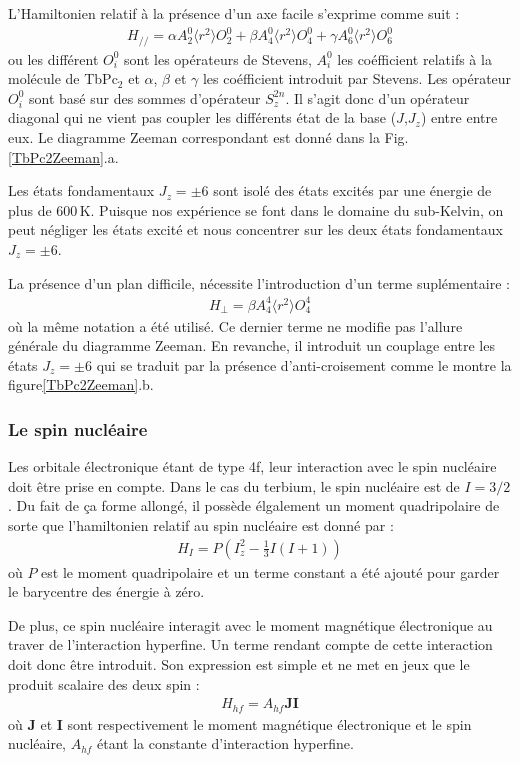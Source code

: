 L'Hamiltonien relatif à la présence d'un axe facile s'exprime comme suit :
\begin{eqnarray}
H_{//} = \alpha A_2^0 \langle r^2 \rangle O_2^0 + \beta A_4^0 \langle r^2 \rangle O_4^0 + \gamma A_6^0 \langle r^2 \rangle O_6^0
\end{eqnarray}
ou les différent $O_i^0$ sont les opérateurs de Stevens, $A_i^0$ les coéfficient relatifs à la molécule de TbPc$_2$ et $\alpha$, $\beta$ et $\gamma$ les coéfficient introduit par Stevens. Les opérateur $O^0_i$ sont basé sur des sommes d'opérateur $S_z^{2n}$. Il s'agit donc d'un opérateur diagonal qui ne vient pas coupler les différents état de la base ($J$,$J_z$) entre entre eux. Le diagramme Zeeman correspondant est donné dans la Fig.\ref{TbPc2Zeeman}.a.

Les états fondamentaux $J_z = \pm 6$ sont isolé des états excités par une énergie de plus de $600$\,K. Puisque nos expérience se font dans le domaine du sub-Kelvin, on peut négliger les états excité et nous concentrer sur les deux états fondamentaux  $J_z = \pm 6$.

La présence d'un plan difficile, nécessite l'introduction d'un terme suplémentaire :
\begin{eqnarray}
H_{\perp} = \beta A_4^4 \langle r^2 \rangle O_4^4
\end{eqnarray}
où la m\^eme notation a été utilisé. Ce dernier terme ne modifie pas l'allure générale du diagramme Zeeman. En revanche, il introduit un couplage entre les états  $J_z = \pm 6$ qui se traduit par la présence d'anti-croisement comme le montre la figure\ref{TbPc2Zeeman}.b.

\subsubsection{Le spin nucléaire}
Les orbitale électronique étant de type 4f, leur interaction avec le spin nucléaire doit \^etre prise en compte. Dans le cas du terbium, le spin nucléaire est de $I = 3/2$. Du fait de ça forme allongé, il possède élgalement un moment quadripolaire de sorte que l'hamiltonien relatif au spin nucléaire est donné par :
\begin{eqnarray}
H_I = P\left(I_z^2 - \frac{1}{3}I(I+1)\right)
\end{eqnarray}
où $P$ est le moment quadripolaire et un terme constant a été ajouté pour garder le barycentre des énergie à zéro.

De plus, ce spin nucléaire interagit avec le moment magnétique électronique au traver de l'interaction hyperfine. Un terme rendant compte de cette interaction doit donc \^etre introduit. Son expression est simple et ne met en jeux que le produit scalaire des deux spin :
\begin{eqnarray}
H_{hf} = A_{hf}\mathbf{J}\mathbf{I}
\end{eqnarray}
où $\mathbf{J}$ et $\mathbf{I}$ sont respectivement le moment magnétique électronique et le spin nucléaire, $A_{hf}$ étant la constante d'interaction hyperfine.


